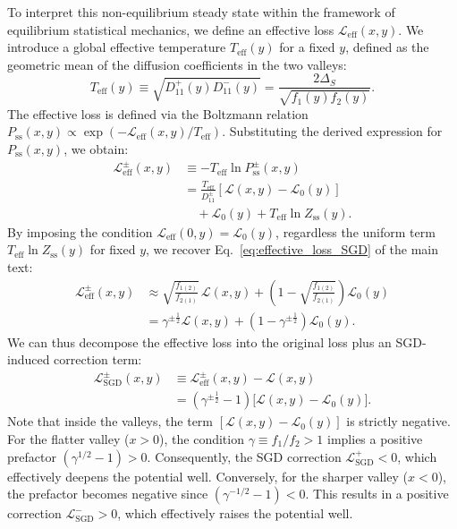 \documentclass[aps,prx,reprint,superscriptaddress,longbibliography,nofootinbib,floatfix]{revtex4-2}
\begin{document}
To interpret this non-equilibrium steady state within the framework of equilibrium statistical mechanics, we define an effective loss $\mathcal{L}_{\mathrm{eff}}(x,y)$. We introduce a global effective temperature $T_{\mathrm{eff}}(y)$ for a fixed $y$, defined as the geometric mean of the diffusion coefficients in the two valleys:
\begin{equation}
    T_{\mathrm{eff}}(y) \equiv \sqrt{D_{11}^+(y) D_{11}^-(y)} = \frac{2\Delta_S}{\sqrt{f_1(y) f_2(y)}}.
\end{equation}
The effective loss is defined via the Boltzmann relation $P_{\mathrm{ss}}(x,y) \propto \exp(-\mathcal{L}_{\mathrm{eff}}(x,y) / T_{\mathrm{eff}})$. Substituting the derived expression for $P_{\mathrm{ss}}(x,y)$, we obtain:
\begin{equation}
\begin{split}
    \mathcal{L}_{\mathrm{eff}}^{\pm}(x,y) &\equiv - T_{\mathrm{eff}}\ln P^{\pm}_{\mathrm{ss}}(x,y) \\
    &= \frac{T_{\mathrm{eff}}}{D_{11}^{\pm}}\left[\mathcal{L}(x,y)-\mathcal{L}_{0}(y)\right] \\
    &\quad +\mathcal{L}_{0}(y)+T_{\mathrm{eff}}\ln Z_{\mathrm{ss}}(y).
\end{split}
\end{equation}
By imposing the condition $\mathcal{L}_{\mathrm{eff}}(0,y) = \mathcal{L}_{0}(y)$, regardless the uniform term $T_{\mathrm{eff}}\ln Z_{\mathrm{ss}}(y)$ for fixed $y$, we recover Eq.~\ref{eq:effective_loss_SGD} of the main text:
\begin{equation}
\begin{split}
    \mathcal{L}_{\mathrm{eff}}^{\pm}(x,y)
    &\approx 
    \sqrt{\frac{f_{1(2)}}{f_{2(1)}}}\,\mathcal{L}(x,y)
    +\left(1-\sqrt{\frac{f_{1(2)}}{f_{2(1)}}}\right)\mathcal{L}_0(y)\\
    &=\gamma^{\pm\frac{1}{2}}\mathcal{L}(x,y)
    +\left(1-\gamma^{\pm\frac{1}{2}}\right)\mathcal{L}_0(y).
\end{split}
\end{equation}
We can thus decompose the effective loss into the original loss plus an SGD-induced correction term:
\begin{equation}
\begin{split}
    \mathcal{L}_{\mathrm{SGD}}^{\pm}(x,y)
    &\equiv \mathcal{L}_{\mathrm{eff}}^{\pm}(x,y)-\mathcal{L}(x,y) \\
    &= \left(\gamma^{\pm\frac{1}{2}}-1\right)
    \big[\mathcal{L}(x,y)-\mathcal{L}_0(y)\big].
\end{split}
\end{equation}
Note that inside the valleys, the term $[\mathcal{L}(x,y) - \mathcal{L}_0(y)]$ is strictly negative. For the flatter valley ($x > 0$), the condition $\gamma\equiv f_1/f_2>1$ implies a positive prefactor $(\gamma^{1/2} - 1) > 0$. Consequently, the SGD correction $\mathcal{L}_{\mathrm{SGD}}^+ < 0$, which effectively deepens the potential well. Conversely, for the sharper valley ($x < 0$), the prefactor becomes negative since $(\gamma^{-1/2} - 1) < 0$. This results in a positive correction $\mathcal{L}_{\mathrm{SGD}}^- > 0$, which effectively raises the potential well.
\end{document}
